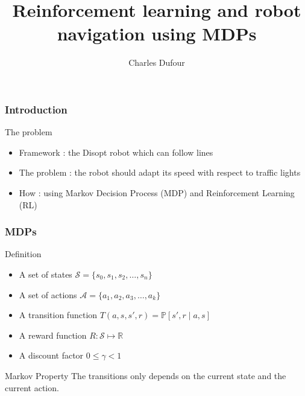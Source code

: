 \documentclass[dvipsnames,svgnames]{beamer}
\author{Charles Dufour}
\title{Reinforcement learning and robot navigation using MDPs}
\newtheorem{madef}{Definition}
\begin{document}
\begin{frame}
\titlepage
\end{frame}




\begin{frame}
\frametitle{Introduction}
\begin{block}{The problem}

  \begin{itemize}
   \item Framework : the Disopt robot which can follow lines
   \item The problem : the robot should adapt its speed with           respect to traffic lights
   \item How : using Markov Decision Process (MDP) and Reinforcement Learning (RL)
  \end{itemize}
\end{block} 
\end{frame}


%

\begin{frame}
\frametitle{MDPs}
\begin{block}{Definition }
\begin{itemize}
\item A set of states $\mathcal{S}=\{s_0,s_1,s_2,\ldots,s_{n}\}$
\item A set of actions $\mathcal{A}=\{a_1,a_2,a_3,\ldots,a_{k}\}$
\item A transition function $T(a,s,s',r) = \mathbb{P}[s',r\mid a,s]$
\item A reward function $R: \mathcal{S}\mapsto \mathbb{R}$
\item A discount factor $0 \leq \gamma < 1$ 
\end{itemize}
\end{block}

\begin{block}{Markov Property}
The transitions only depends on the current state and the current action.
\end{block}
\end{frame}
\end{document}
